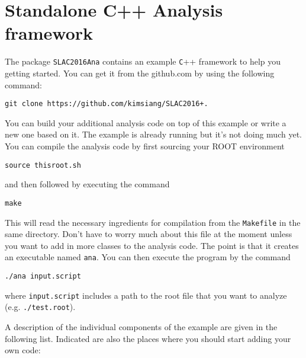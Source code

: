 \chapter{Standalone C++ Analysis framework}
\label{chap:rootframework}

The package \verb+SLAC2016Ana+ contains an example \verb+C+++ framework to help you getting started. You can get it from the github.com by using the following command:
%
\begin{Verbatim}[frame=single]
git clone https://github.com/kimsiang/SLAC2016+. 
\end{Verbatim}
%
You can build your additional analysis code on top of this example or write a new one based on it. The example is already running but it's not doing much yet. You can compile the analysis code by first sourcing your ROOT environment
%
\begin{Verbatim}[frame=single]
source thisroot.sh
\end{Verbatim}
%
and then followed by executing the command
\begin{Verbatim}[frame=single]
make
\end{Verbatim}
%
This will read the necessary ingredients for compilation from the \verb+Makefile+ in the same directory. Don't have to worry much about this file at the moment unless you want to add in more classes to the analysis code.
The point is that it creates an executable named \verb+ana+. You can then execute the program by the command 
%
\begin{Verbatim}[frame=single]
./ana input.script
\end{Verbatim}
%
where \verb+input.script+ includes a path to the root file that you want to analyze (e.g. \verb+./test.root+). 

A description of the individual components of the example are given in the following list. Indicated are also the places where you should start adding your own code:

